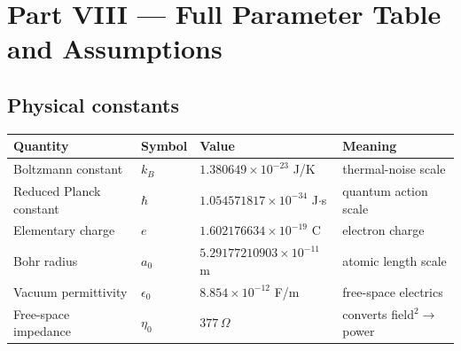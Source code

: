 \documentclass[11pt]{article}
\begin{document}
\newpage
\section{Part VIII --- Full Parameter Table and Assumptions}

\subsection*{Physical constants}
\begin{center}
\begin{tabular}{@{}llll@{}}
\toprule
Quantity & Symbol & Value & Meaning \\ \midrule
Boltzmann constant & $k_B$ & $1.380649\times10^{-23}$ J/K & thermal-noise scale \\
Reduced Planck constant & $\hbar$ & $1.054571817\times10^{-34}$ J$\cdot$s & quantum action scale \\
Elementary charge & $e$ & $1.602176634\times10^{-19}$ C & electron charge \\
Bohr radius & $a_0$ & $5.29177210903\times10^{-11}$ m & atomic length scale \\
Vacuum permittivity & $\epsilon_0$ & $8.854\times10^{-12}$ F/m & free-space electrics \\
Free-space impedance & $\eta_0$ & $377\,\Omega$ & converts field$^2\to$power \\
\bottomrule
\end{tabular}
\end{center}
\end{document}
